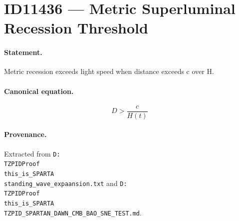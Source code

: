 \section*{ID11436 --- Metric Superluminal Recession Threshold}

\paragraph{Statement.}
Metric recession exceeds light speed when distance exceeds c over H.

\paragraph{Canonical equation.}
\[
D>\frac{c}{H(t)}
\]

\paragraph{Provenance.}
Extracted from \texttt{D:\\TZPIDProof\\this\_is\_SPARTA\\standing\_wave\_expaansion.txt} and \texttt{D:\\TZPIDProof\\this\_is\_SPARTA\\TZPID\_SPARTAN\_DAWN\_CMB\_BAO\_SNE\_TEST.md}.
